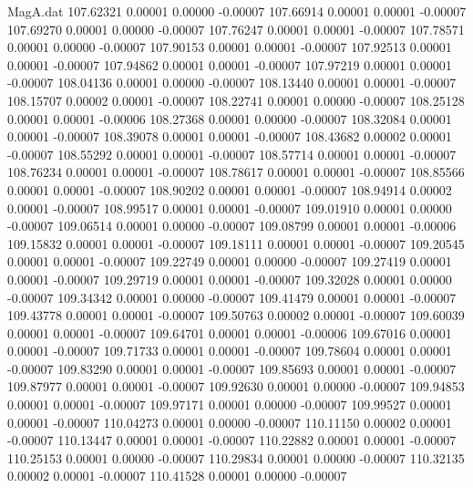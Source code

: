\begin{filecontents}{MagA.dat}
 107.62321    0.00001    0.00000   -0.00007
 107.66914    0.00001    0.00001   -0.00007
 107.69270    0.00001    0.00000   -0.00007
 107.76247    0.00001    0.00001   -0.00007
 107.78571    0.00001    0.00000   -0.00007
 107.90153    0.00001    0.00001   -0.00007
 107.92513    0.00001    0.00001   -0.00007
 107.94862    0.00001    0.00001   -0.00007
 107.97219    0.00001    0.00001   -0.00007
 108.04136    0.00001    0.00000   -0.00007
 108.13440    0.00001    0.00001   -0.00007
 108.15707    0.00002    0.00001   -0.00007
 108.22741    0.00001    0.00000   -0.00007
 108.25128    0.00001    0.00001   -0.00006
 108.27368    0.00001    0.00000   -0.00007
 108.32084    0.00001    0.00001   -0.00007
 108.39078    0.00001    0.00001   -0.00007
 108.43682    0.00002    0.00001   -0.00007
 108.55292    0.00001    0.00001   -0.00007
 108.57714    0.00001    0.00001   -0.00007
 108.76234    0.00001    0.00001   -0.00007
 108.78617    0.00001    0.00001   -0.00007
 108.85566    0.00001    0.00001   -0.00007
 108.90202    0.00001    0.00001   -0.00007
 108.94914    0.00002    0.00001   -0.00007
 108.99517    0.00001    0.00001   -0.00007
 109.01910    0.00001    0.00000   -0.00007
 109.06514    0.00001    0.00000   -0.00007
 109.08799    0.00001    0.00001   -0.00006
 109.15832    0.00001    0.00001   -0.00007
 109.18111    0.00001    0.00001   -0.00007
 109.20545    0.00001    0.00001   -0.00007
 109.22749    0.00001    0.00000   -0.00007
 109.27419    0.00001    0.00001   -0.00007
 109.29719    0.00001    0.00001   -0.00007
 109.32028    0.00001    0.00000   -0.00007
 109.34342    0.00001    0.00000   -0.00007
 109.41479    0.00001    0.00001   -0.00007
 109.43778    0.00001    0.00001   -0.00007
 109.50763    0.00002    0.00001   -0.00007
 109.60039    0.00001    0.00001   -0.00007
 109.64701    0.00001    0.00001   -0.00006
 109.67016    0.00001    0.00001   -0.00007
 109.71733    0.00001    0.00001   -0.00007
 109.78604    0.00001    0.00001   -0.00007
 109.83290    0.00001    0.00001   -0.00007
 109.85693    0.00001    0.00001   -0.00007
 109.87977    0.00001    0.00001   -0.00007
 109.92630    0.00001    0.00000   -0.00007
 109.94853    0.00001    0.00001   -0.00007
 109.97171    0.00001    0.00000   -0.00007
 109.99527    0.00001    0.00001   -0.00007
 110.04273    0.00001    0.00000   -0.00007
 110.11150    0.00002    0.00001   -0.00007
 110.13447    0.00001    0.00001   -0.00007
 110.22882    0.00001    0.00001   -0.00007
 110.25153    0.00001    0.00000   -0.00007
 110.29834    0.00001    0.00000   -0.00007
 110.32135    0.00002    0.00001   -0.00007
 110.41528    0.00001    0.00000   -0.00007

\end{filecontents}
